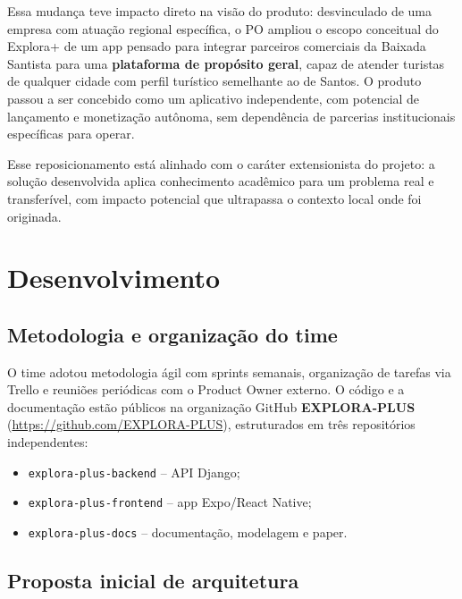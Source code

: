 \documentclass[12pt, a4paper]{article}
\begin{document}
Essa mudan\c{c}a teve impacto direto na vis\~ao do produto: desvinculado de uma empresa com atuação regional específica, o PO ampliou o escopo conceitual do Explora+ de um app pensado para integrar parceiros comerciais da Baixada Santista para uma \textbf{plataforma de prop\'osito geral}, capaz de atender turistas de qualquer cidade com perfil tur\'istico semelhante ao de Santos. O produto passou a ser concebido como um aplicativo independente, com potencial de lan\c{c}amento e monetiza\c{c}\~ao aut\^onoma, sem depend\^encia de parcerias institucionais espec\'ificas para operar.

Esse reposicionamento est\'a alinhado com o car\'ater extensionista do projeto: a solu\c{c}\~ao desenvolvida aplica conhecimento acad\^emico para um problema real e transferível, com impacto potencial que ultrapassa o contexto local onde foi originada.

\section{Desenvolvimento}

\subsection{Metodologia e organiza\c{c}\~ao do time}

O time adotou metodologia \'agil com sprints semanais, organiza\c{c}\~ao de tarefas via Trello e reuni\~oes peri\'odicas com o Product Owner externo. O c\'odigo e a documenta\c{c}\~ao est\~ao p\'ublicos na organiza\c{c}\~ao GitHub \textbf{EXPLORA-PLUS} (\url{https://github.com/EXPLORA-PLUS}), estruturados em tr\^es reposit\'orios independentes:

\begin{itemize}
  \item \texttt{explora-plus-backend} -- API Django;
  \item \texttt{explora-plus-frontend} -- app Expo/React Native;
  \item \texttt{explora-plus-docs} -- documenta\c{c}\~ao, modelagem e paper.
\end{itemize}

\subsection{Proposta inicial de arquitetura}
\end{document}
